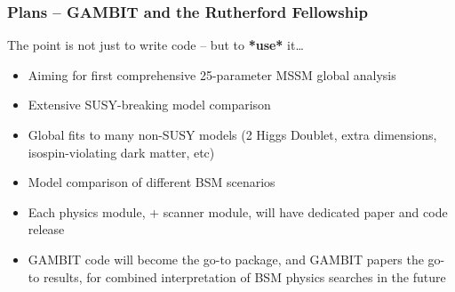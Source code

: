 \documentclass[xcolor=dvipsnames]{beamer}
\begin{document}
\begin{frame}
\frametitle{Plans -- GAMBIT and the Rutherford Fellowship}

The point is not just to write code -- but to \textbf{*use*} it\ldots
\begin{itemize}
\item Aiming for first comprehensive 25-parameter MSSM global analysis 
\item Extensive SUSY-breaking model comparison
\item Global fits to many non-SUSY models (2 Higgs Doublet, extra dimensions, isospin-violating dark matter, etc)
\item Model comparison of different BSM scenarios
\item Each physics module, + scanner module, will have dedicated paper and code release
\item GAMBIT code will become the go-to package, and GAMBIT papers the go-to results, for combined interpretation of BSM physics searches in the future
\end{itemize}

\end{frame}
\end{document}
